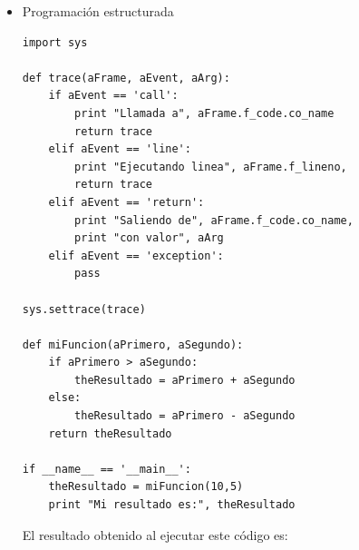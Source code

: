 \documentclass[12pt,legalpaper]{report}
\begin{document}
\begin{itemize}
	\item{Programación estructurada}

\begin{singlespace}
\begin{lstlisting}[style=Python]
import sys

def trace(aFrame, aEvent, aArg):
    if aEvent == 'call':
        print "Llamada a", aFrame.f_code.co_name
        return trace
    elif aEvent == 'line':
        print "Ejecutando linea", aFrame.f_lineno, 
        return trace
    elif aEvent == 'return':
        print "Saliendo de", aFrame.f_code.co_name, 
        print "con valor", aArg
    elif aEvent == 'exception':
        pass

sys.settrace(trace)

def miFuncion(aPrimero, aSegundo):
    if aPrimero > aSegundo:
        theResultado = aPrimero + aSegundo
    else:
        theResultado = aPrimero - aSegundo
    return theResultado

if __name__ == '__main__':
    theResultado = miFuncion(10,5)
    print "Mi resultado es:", theResultado
\end{lstlisting}
\end{singlespace}

El resultado obtenido al ejecutar este código es:
\end{itemize}
\end{document}
